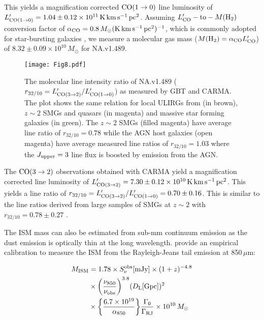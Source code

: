 \documentclass[iop,apj,useAMS,usenatbib]{emulateapj-rtx4}
\begin{document}
This yields a magnification corrected ${\rm CO(1\rightarrow0)}$ line
luminosity of $L_{\rm
  CO(1\rightarrow0)}^{\prime}=1.04\pm0.12\times10^{11}\,{\rm
  K\,km\,s^{-1}\,pc^2}$. Assuming $L_{\rm CO}^{\prime}-{\rm to}-M({\rm
  H_2})$ conversion factor of $\alpha_{\rm CO} = 0.8\,M_{\odot}{\rm
  (K\,km\,s^{-1}\,pc^2)^{-1}}$, which is commonly adopted for
star-bursting galaxies \citep{Downes1998, Solomon2005,
  Tacconi2008}, we measure a molecular gas mass ($M({\rm
  H_2})=\alpha_{\rm CO}L^{\prime}_{\rm CO}$) of
$8.32\pm0.09\times10^{10}\,M_{\odot}$ for NA.v1.489.

\begin{figure}
\begin{center}
\texttt{[image: Fig8.pdf]} 
\caption{The molecular line intensity ratio of NA.v1.489 ($r_{32/10}=L_{\rm CO(3 \rightarrow2)}^{\prime}/L_{\rm CO(1\rightarrow0)}^{\prime}$) as measured by GBT and
  CARMA. The plot shows the same relation for local
  ULIRGs from \citet{Papadopoulos2012} (in brown), $z\sim2$ SMGs and quasars
  \citep{Sharon2016} (in magenta) and massive star forming galaxies
  \citep{Aravena2014, Daddi2015} (in green). The $z\sim2$ SMGs (filled magenta)
  have average line ratio of $r_{32/10}=0.78$ while the AGN host galaxies (open magenta)
  have average measured line ratios of $r_{32/10}=1.03$
  \citep{Sharon2016} where the $J_{\rm upper}=3$ line flux is boosted by
  emission from the AGN.}
\label{fig:Fig8}
\end{center}
\end{figure}

The $\rm {CO (3\rightarrow 2)}$ observations obtained with CARMA yield
a magnification corrected line
luminosity of $L_{\rm CO(3\rightarrow2)}^{\prime}=7.30\pm0.12\times10^{10}\,{\rm
  K\,km\,s^{-1}\,pc^2}$. This yields a line
ratio of $r_{32/10}=L_{\rm CO(3 \rightarrow2)}^{\prime}/L_{\rm CO(1
  \rightarrow0)}^{\prime}=0.70\pm0.16$. This is similar to the
  line ratios derived from large samples of SMGs at $z\sim2$ with
  $r_{32/10}=0.78\pm0.27$ \citep{Sharon2016}.

The ISM mass can also be estimated from sub-mm
continuum emission \citep{Magdis2012, Scoville2014, Scoville2016} as
the dust emission is optically thin at the long
wavelength. \citet{Scoville2016} provide an empirical calibration to measure
the ISM from the Rayleigh-Jeans tail emission at 850\,$\mu$m:

\begin{equation}
\begin{split}
M_{\rm ISM}&=1.78 \times S^{\rm obs}_{\nu} [{\rm mJy}] \times
(1+z)^{-4.8}\\
&\times \bigg(\frac{\nu_{850}}{\nu_{\rm obs}}\bigg)^{3.8}(D_{\rm
  L}[{\rm Gpc}])^2\\
&\times
\bigg\{\frac{6.7\times10^{19}}{\alpha_{850}}\bigg\}\frac{\Gamma_0}{\Gamma_{\rm
  RJ}}\times10^{10}\,M_{\odot}
\end{split}
\end{equation}
\end{document}
